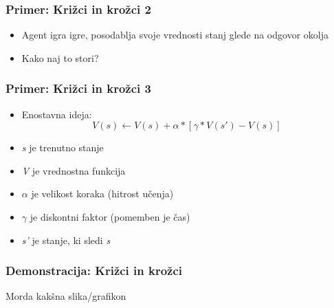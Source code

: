 \documentclass[14pt]{beamer}    %
\begin{document}
\begin{frame}
    \frametitle{Primer: Križci in krožci 2}
    \begin{itemize}
        \item Agent igra igre, posodablja svoje vrednosti stanj glede na odgovor okolja
        \item Kako naj to stori?
    \end{itemize}
\end{frame}


\begin{frame}
    \frametitle{Primer: Križci in krožci 3}
    \begin{itemize}
        \item Enostavna ideja:                                  \pause
        $$
        V(s) \leftarrow V(s) + \alpha * [\gamma * V(s') - V(s)]
        $$
                                                                \pause
        \item \textit{s} je trenutno stanje                     \pause
        \item \textit{V} je vrednostna funkcija                 \pause
        \item $\alpha$ je velikost koraka (hitrost učenja)      \pause
        \item $\gamma$ je diskontni faktor (pomemben je čas)    \pause
        \item \textit{s'} je stanje, ki sledi \textit{s}        
    \end{itemize}
\end{frame}

\begin{frame}
    \frametitle{Demonstracija: Križci in krožci}
    Morda kakšna slika/grafikon
\end{frame}
\end{document}
